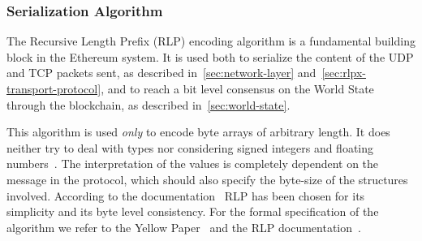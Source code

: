 \subsubsection{Serialization Algorithm}
\label{sec:marshaling}
The Recursive Length Prefix (RLP) encoding algorithm is a fundamental building
block in the Ethereum system. It is used both to serialize the content of the
UDP and TCP packets sent, as described in~\autoref{sec:network-layer}
and~\autoref{sec:rlpx-transport-protocol}, and to reach a bit level consensus on
the World State through the blockchain, as described
in~\autoref{sec:world-state}.


This algorithm is used \emph{only} to encode byte arrays of arbitrary length.
It does neither try to deal with types nor considering signed integers and
floating numbers~\cite{wood2018ethereum}. The interpretation of the values
is completely dependent on the message in the protocol, which should
also specify the byte-size of the structures involved.
According to the documentation~\cite{bib:design-rationale} RLP has been chosen
for its simplicity and its byte level consistency.
For the formal specification of the algorithm we refer
to the Yellow Paper~\cite[Appendix B]{wood2018ethereum} and the RLP
documentation~\cite{bib:ethereumrlpspec}.
